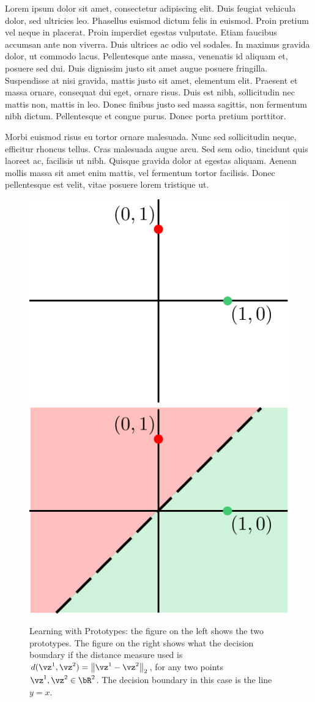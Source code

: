 \documentclass[a4paper,11pt]{article}
\begin{document}
\begin{mlsolution}


Lorem ipsum dolor sit amet, consectetur adipiscing elit. Duis feugiat vehicula dolor, sed ultricies leo. Phasellus euismod dictum felis in euismod. Proin pretium vel neque in placerat. Proin imperdiet egestas vulputate. Etiam faucibus accumsan ante non viverra. Duis ultrices ac odio vel sodales. In maximus gravida dolor, ut commodo lacus. Pellentesque ante massa, venenatis id aliquam et, posuere sed dui. Duis dignissim justo sit amet augue posuere fringilla. Suspendisse at nisi gravida, mattis justo sit amet, elementum elit. Praesent et massa ornare, consequat dui eget, ornare risus. Duis est nibh, sollicitudin nec mattis non, mattis in leo. Donec finibus justo sed massa sagittis, non fermentum nibh dictum. Pellentesque et congue purus. Donec porta pretium porttitor.

Morbi euismod risus eu tortor ornare malesuada. Nunc sed sollicitudin neque, efficitur rhoncus tellus. Cras malesuada augue arcu. Sed sem odio, tincidunt quis laoreet ac, facilisis ut nibh. Quisque gravida dolor at egestas aliquam. Aenean mollis massa sit amet enim mattis, vel fermentum tortor facilisis. Donec pellentesque est velit, vitae posuere lorem tristique ut.

\begin{figure}[th]%
\centering
\includegraphics[width=0.4\columnwidth]{proto_blank.png}%
\hfill
\includegraphics[width=0.4\columnwidth]{proto_euclid_sample.png}%
\caption{Learning with Prototypes: the figure on the left shows the two prototypes. The figure on the right shows what the decision boundary if the distance measure used is $d(\vz^1,\vz^2) = \norm{\vz^1-\vz^2}_2$, for any two points $\vz^1,\vz^2 \in \bR^2$. The decision boundary in this case is the line $y = x$.}%
\label{fig:proto}%
\end{figure}


\end{mlsolution}
\end{document}
